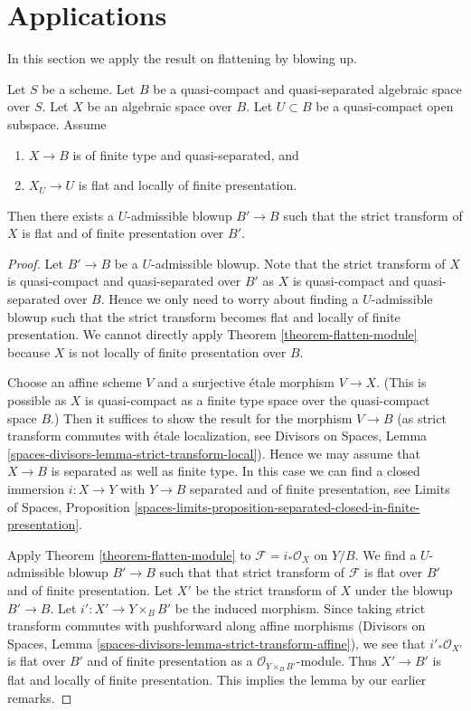 \section{Applications}
\label{section-applications-flattening-by-blowing-up}

\noindent
In this section we apply the result on flattening by blowing up.

\begin{lemma}
\label{lemma-flat-after-blowing-up}
Let $S$ be a scheme.
Let $B$ be a quasi-compact and quasi-separated algebraic space over $S$.
Let $X$ be an algebraic space over $B$.
Let $U \subset B$ be a quasi-compact open subspace.
Assume
\begin{enumerate}
\item $X \to B$ is of finite type and quasi-separated, and
\item $X_U \to U$ is flat and locally of finite presentation.
\end{enumerate}
Then there exists a $U$-admissible blowup $B' \to B$ such that
the strict transform of $X$ is flat and of finite presentation
over $B'$.
\end{lemma}

\begin{proof}
Let $B' \to B$ be a $U$-admissible blowup. Note that the strict transform
of $X$ is quasi-compact and quasi-separated over $B'$ as $X$ is quasi-compact
and quasi-separated over $B$. Hence we only need to worry about finding
a $U$-admissible blowup such that the strict transform becomes flat and
locally of finite presentation. We cannot directly apply
Theorem \ref{theorem-flatten-module} because $X$ is not locally of finite
presentation over $B$.

\medskip\noindent
Choose an affine scheme $V$ and a surjective \'etale morphism $V \to X$.
(This is possible as $X$ is quasi-compact as a finite type space over
the quasi-compact space $B$.) Then it suffices to show the result for
the morphism $V \to B$ (as strict transform commutes with \'etale
localization, see Divisors on Spaces,
Lemma \ref{spaces-divisors-lemma-strict-transform-local}).
Hence we may assume that $X \to B$ is separated as well as finite type.
In this case we can find a closed immersion $i : X \to Y$ with $Y \to B$
separated and of finite presentation, see
Limits of Spaces, Proposition
\ref{spaces-limits-proposition-separated-closed-in-finite-presentation}.

\medskip\noindent
Apply Theorem \ref{theorem-flatten-module} to $\mathcal{F} = i_*\mathcal{O}_X$
on $Y/B$. We find a $U$-admissible blowup $B' \to B$ such that that strict
transform of $\mathcal{F}$ is flat over $B'$ and of finite presentation.
Let $X'$ be the strict transform of $X$ under the blowup $B' \to B$.
Let $i' : X' \to Y \times_B B'$ be the induced morphism.
Since taking strict transform commutes with pushforward along affine
morphisms (Divisors on Spaces, Lemma
\ref{spaces-divisors-lemma-strict-transform-affine}),
we see that $i'_*\mathcal{O}_{X'}$ is flat over $B'$ and of
finite presentation as a $\mathcal{O}_{Y \times_B B'}$-module.
Thus $X' \to B'$ is flat and locally of finite presentation.
This implies the lemma by our earlier remarks.
\end{proof}

